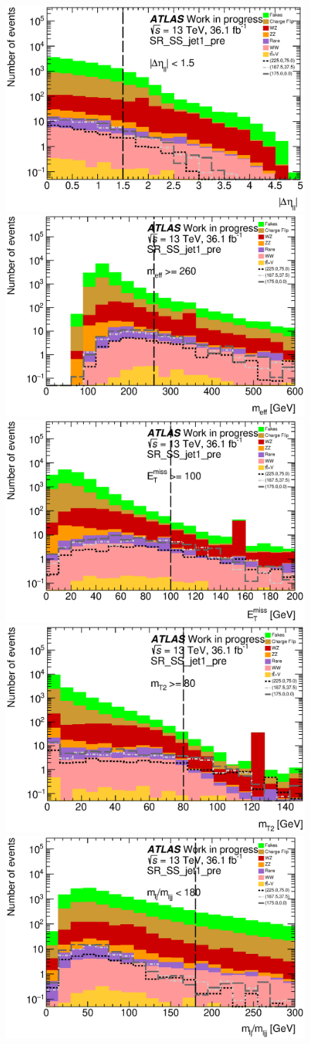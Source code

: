 \begin{figure}[htpb]
\centering
\includegraphics[width=0.45\linewidth]{data/plot/plot_SR/dEta_SR_SS_jet1_pre}
\includegraphics[width=0.45\linewidth]{data/plot/plot_SR/meff_SR_SS_jet1_pre}\\
\includegraphics[width=0.45\linewidth]{data/plot/plot_SR/MET_SR_SS_jet1_pre}
\includegraphics[width=0.45\linewidth]{data/plot/plot_SR/mTtwo_SR_SS_jet1_pre}\\
\includegraphics[width=0.45\linewidth]{data/plot/plot_SR/mlj_SR_SS_jet1_pre}

\end{figure}
